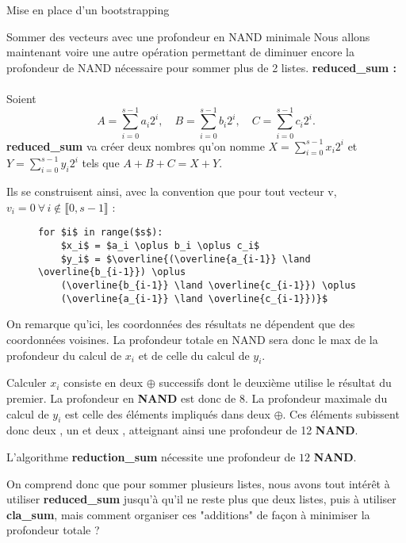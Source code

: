 \begin{section}{Mise en place d'un bootstrapping}
\begin{subsection}{Sommer des vecteurs avec une profondeur en NAND minimale}
Nous allons maintenant voire une autre opération permettant de diminuer 
encore la profondeur de NAND nécessaire pour sommer plus de 2 listes. 
\vspace{0.3cm}
\noindent
\textbf{reduced\_sum :}
\paragraph{}

	Soient 
\[A = \sum_{i=0}^{s-1} a_i 2^i, \quad B = \sum_{i=0}^{s-1} b_i 2^i, \quad C = \sum_{i=0}^{s-1} c_i 2^i. \]
\textbf{reduced\_sum} va créer deux nombres qu'on nomme $X = \sum_{i=0}^{s-1} x_i 2^i$  et $Y = \sum_{i=0}^{s-1} y_i 2^i$ tels que $A + B + C = X + Y$.

	Ils se construisent ainsi, avec la convention que pour tout vecteur v, $v_i = 0 \  \forall \, i \not\in \llbracket 0, s-1 \rrbracket$ :
\begin{figure}[!h]
\begin{lstlisting}
for $i$ in range($s$):
	$x_i$ = $a_i \oplus b_i \oplus c_i$
	$y_i$ = $\overline{(\overline{a_{i-1}} \land \overline{b_{i-1}}) \oplus
	(\overline{b_{i-1}} \land \overline{c_{i-1}}) \oplus
	(\overline{a_{i-1}} \land \overline{c_{i-1}})}$
\end{lstlisting}
\end{figure}

	On remarque qu'ici, les coordonnées des résultats ne dépendent que des coordonnées voisines. La profondeur totale en NAND sera donc le max de la profondeur du calcul de $x_i$ et de celle du calcul de $y_i$.
	
	Calculer $x_i$ consiste en deux $\oplus$ successifs dont le deuxième utilise le résultat du premier. La profondeur en \textbf{NAND} est donc de 8. La profondeur maximale du calcul de $y_i$ est celle des éléments impliqués dans deux $\oplus$. Ces éléments subissent donc deux , un  et deux , atteignant ainsi une profondeur de 12 \textbf{NAND}.

\begin{prop}
	L'algorithme \textbf{reduction\_sum} nécessite une profondeur de $12$ \textbf{NAND}.
\end{prop}

	On comprend donc que pour sommer plusieurs listes, nous avons tout
	intérêt à utiliser \textbf{reduced\_sum} jusqu'à qu'il ne reste plus
	que deux listes, puis à utiliser \textbf{cla\_sum}, mais comment organiser ces "additions" de façon à minimiser la profondeur totale ?


\end{subsection}
\end{section}
